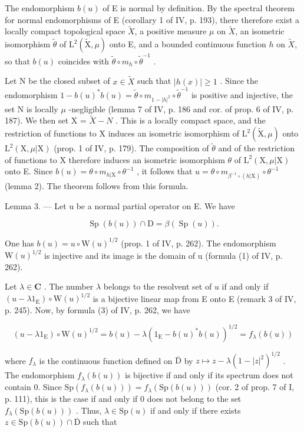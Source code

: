 The endomorphism \(b(u)\) of E is normal by definition. By the spectral theorem for normal endomorphisms of E (corollary 1 of IV, p. 193), there therefore exist a locally compact topological space \(\widetilde{X}\), a positive measure \(\mu\) on \(\widetilde{X}\), an isometric isomorphism \(\widetilde{\theta}\) of \(\mathrm{L}^2 (\widetilde{\mathrm{X}},\mu)\) onto E, and a bounded continuous function \(h\) on \(\widetilde{X}\), so that \(b(u)\) coincides with \(\widetilde{\theta}\circ m_h\circ \widetilde{\theta}^{-1}\) .

Let N be the closed subset of \(x \in \widetilde{X}\) such that \(|h(x)| \geqslant 1\) . Since the endomorphism \(1 - b(u)^{*}b(u) = \widetilde{\theta} \circ m_{1-|h|^2} \circ \widetilde{\theta}^{-1}\) is positive and injective, the set N is locally \(\mu\) -negligible (lemma 7 of IV, p. 186 and cor. of prop. 6 of IV, p. 187). We then set X = \(\widetilde{X} - N\) . This is a locally compact space, and the restriction of functions to X induces an isometric isomorphism of \(\mathrm{L}^{2}(\widetilde{\mathrm{X}}, \mu)\) onto \(\mathrm{L}^{2}(\mathrm{X}, \mu|\mathrm{X})\) (prop. 1 of IV, p. 179). The composition of \(\widetilde{\theta}\) and of the restriction of functions to X therefore induces an isometric isomorphism \(\theta\) of \(\mathrm{L}^{2}(\mathrm{X}, \mu|\mathrm{X})\) onto E. Since \(b(u) = \theta \circ m_{h|\mathrm{X}} \circ \theta^{-1}\) , it follows that \(u = \theta \circ m_{\beta^{-1} \circ (h|\mathrm{X})} \circ \theta^{-1}\) (lemma 2). The theorem follows from this formula.

Lemma 3. --- Let u be a normal partial operator on E. We have

\[
\operatorname{Sp} (b (u)) \cap \mathrm{D} = \beta (\operatorname{Sp} (u)).
\]

One has \(b(u) = u \circ \mathrm{W}(u)^{1/2}\) (prop. 1 of IV, p. 262). The endomorphism \(\mathrm{W}(u)^{1/2}\) is injective and its image is the domain of u (formula (1) of IV, p. 262).

Let \(\lambda \in \mathbf{C}\) . The number \(\lambda\) belongs to the resolvent set of \(u\) if and only if \((u - \lambda 1_{\mathrm{E}}) \circ \mathrm{W}(u)^{1/2}\) is a bijective linear map from E onto E (remark 3 of IV, p. 245). Now, by formula (3) of IV, p. 262, we have

\[
(u - \lambda 1 _ {\mathrm{E}}) \circ \mathrm{W} (u) ^ {1 / 2} = b (u) - \lambda (1 _ {\mathrm{E}} - b (u) ^ {*} b (u)) ^ {1 / 2} = f _ {\lambda} (b (u))
\]

where \(f_{\lambda}\) is the continuous function defined on \(\overline{\mathrm{D}}\) by \(z \mapsto z - \lambda (1 - |z|^2)^{1/2}\) . The endomorphism \(f_{\lambda}(b(u))\) is bijective if and only if its spectrum does not contain 0. Since \(\mathrm{Sp}(f_{\lambda}(b(u))) = f_{\lambda}(\mathrm{Sp}(b(u)))\) (cor. 2 of prop. 7 of I, p. 111), this is the case if and only if 0 does not belong to the set \(f_{\lambda}(\mathrm{Sp}(b(u)))\) . Thus, \(\lambda \in \mathrm{Sp}(u)\) if and only if there exists \(z \in \mathrm{Sp}(b(u)) \cap \overline{\mathrm{D}}\) such that

